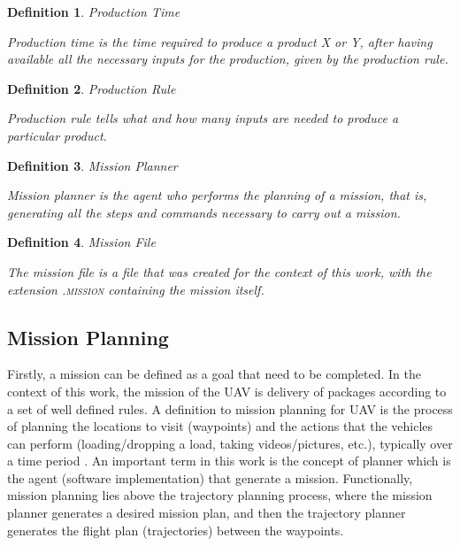 \documentclass[conference,harvard,brazil,english]{sbatex}
\newtheorem{myDefinition}{Definition}
\begin{document}
\begin{myDefinition}{Production Time}

Production time is the time required to produce a product X or Y, after having available all the necessary inputs for the production, given by the production rule.
\label{tempoProducao}
\end{myDefinition}

\begin{myDefinition}{Production Rule}

Production rule tells what and how many inputs are needed to produce a particular product.
\label{regraProducao}
\end{myDefinition}

\begin{myDefinition}{Mission Planner}

Mission planner is the agent who performs the planning of a mission, that is, generating all the steps and commands necessary to carry out a mission.
\label{planejadorMissao}
\end{myDefinition}

\begin{myDefinition}{Mission File}

The mission file is a file that was created for the context of this work, with the extension \textsc{.mission} containing the mission itself.
\label{arquivoMissao}
\end{myDefinition}


\subsection{Mission Planning}
\label{subsec:missionplanning}

Firstly, a mission can be defined as a goal that need to be completed. In the context of this work, the mission of the UAV is delivery of packages according to a set of well defined rules. A definition to mission planning for UAV is the process of planning the locations to visit (waypoints) and the actions that the vehicles can perform (loading/dropping a load, taking videos/pictures, etc.), typically over a time period \cite{ramirez2014solving}. An important term in this work is the concept of planner which is the agent (software implementation) that generate a mission. Functionally, mission planning lies above the trajectory planning process, where the mission planner generates a desired mission plan, and then the trajectory planner generates the flight plan (trajectories) between the waypoints.
\end{document}
